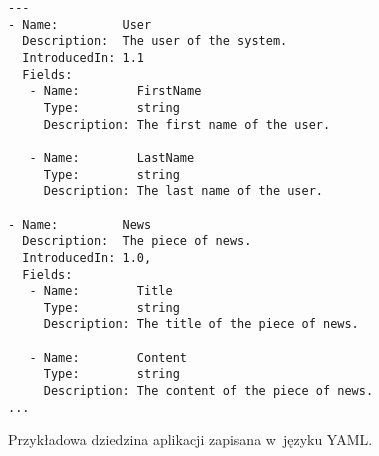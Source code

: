 \begin{figure}[!ht]
\begin{verbatim}
---
- Name:         User
  Description:  The user of the system.
  IntroducedIn: 1.1
  Fields:
   - Name:        FirstName
     Type:        string
     Description: The first name of the user.
     
   - Name:        LastName
     Type:        string
     Description: The last name of the user.
   
- Name:         News
  Description:  The piece of news.
  IntroducedIn: 1.0,
  Fields:
   - Name:        Title
     Type:        string
     Description: The title of the piece of news.
     
   - Name:        Content
     Type:        string
     Description: The content of the piece of news.
...
\end{verbatim}

\caption{Przykładowa dziedzina aplikacji zapisana w~języku YAML.}
\label{fig:implementation_core:yaml}
\end{figure}
